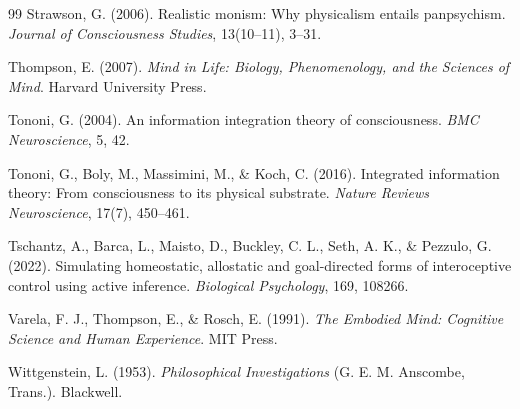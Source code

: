 \documentclass[11pt]{article}
\begin{document}
\begin{thebibliography}{99}
 Strawson, G. (2006). Realistic monism: Why physicalism entails panpsychism. \textit{Journal of Consciousness Studies}, 13(10--11), 3--31.

 Thompson, E. (2007). \textit{Mind in Life: Biology, Phenomenology, and the Sciences of Mind}. Harvard University Press.

 Tononi, G. (2004). An information integration theory of consciousness. \textit{BMC Neuroscience}, 5, 42.

 Tononi, G., Boly, M., Massimini, M., \& Koch, C. (2016). Integrated information theory: From consciousness to its physical substrate. \textit{Nature Reviews Neuroscience}, 17(7), 450--461.

 Tschantz, A., Barca, L., Maisto, D., Buckley, C. L., Seth, A. K., \& Pezzulo, G. (2022). Simulating homeostatic, allostatic and goal-directed forms of interoceptive control using active inference. \textit{Biological Psychology}, 169, 108266.

 Varela, F. J., Thompson, E., \& Rosch, E. (1991). \textit{The Embodied Mind: Cognitive Science and Human Experience}. MIT Press.

 Wittgenstein, L. (1953). \textit{Philosophical Investigations} (G. E. M. Anscombe, Trans.). Blackwell.

\end{thebibliography}
\end{document}
